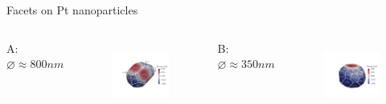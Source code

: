 \begin{frame}{Facets on Pt nanoparticles}
    \begin{columns}
        \centering
        A: $\diameter \approx 800 nm$ 
        \begin{figure}
            \centering
            \includegraphics[trim=50 50 130 100, clip, width=\textwidth]{Figures/bcdi_data/D6/D6_facets.png}
            \label{fig:facets_D6}
        \end{figure}

        \centering
        B: $\diameter \approx 350 nm$ 

        \begin{figure}
            \centering
            \includegraphics[trim=50 50 0 100, clip, width=\textwidth]{Figures/bcdi_data/B7/B7_facets.png}
            \label{fig:facets_B7}
        \end{figure}


\end{columns}
\end{frame}

